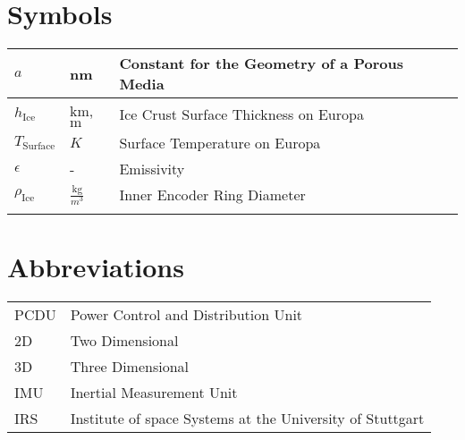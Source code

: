 \chapter*{Symbols}

\begin{longtable}[c]{lll}
  $a$                      & nm                                          & Constant for the Geometry of a Porous Media   \\
\endfirsthead
%
\endhead
%


$h_\text{Ice}$           & $\text{km}$,$\text{m}$                      & Ice Crust Surface Thickness on Europa         \\
$T_\text{Surface}$       & $K$                                         & Surface Temperature on Europa                 \\
$\epsilon$               & -                                           & Emissivity                                    \\
$\rho_\text{Ice}$       & $\frac{\text{kg}}{m^3}$                      & Inner Encoder Ring Diameter                   \\
   

\label{tab:my-table}\\
\end{longtable}




\chapter*{Abbreviations}
\begin{table}[htb]
\begin{tabular}[l]{ll}
PCDU      & Power Control and Distribution Unit \\
2D		& Two Dimensional \\
3D		& Three Dimensional \\
IMU     & Inertial Measurement Unit \\
IRS     & Institute of space Systems at the University of Stuttgart \\

\end{tabular}
\end{table}


